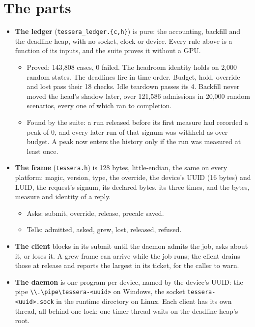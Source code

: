 \section{\texorpdfstring{The parts}{The parts}}

\begin{itemize}
\item \textbf{The ledger} (\texttt{tessera\_\allowbreak{}ledger.\allowbreak{}\{c,h\}}) is pure: the accounting, backfill and the deadline heap, with no socket, clock or device. Every rule above is a function of its inputs, and the suite proves it without a GPU.

\begin{itemize}
\item Proved: 143,808 cases, 0 failed. The headroom identity holds on 2,000 random states. The deadlines fire in time order. Budget, hold, override and lost pass their 18 checks. Idle teardown passes its 4. Backfill never moved the head's shadow later, over 121,586 admissions in 20,000 random scenarios, every one of which ran to completion.
\item Found by the suite: a run released before its first measure had recorded a peak of 0, and every later run of that signum was withheld as over budget. A peak now enters the history only if the run was measured at least once.
\end{itemize}
\item \textbf{The frame} (\texttt{tessera.\allowbreak{}h}) is 128 bytes, little-endian, the same on every platform: magic, version, type, the override, the device's UUID (16 bytes) and LUID, the request's signum, its declared bytes, its three times, and the bytes, measure and identity of a reply.

\begin{itemize}
\item Asks: submit, override, release, precalc saved.
\item Tells: admitted, asked, grew, lost, released, refused.
\end{itemize}
\item \textbf{The client} blocks in its submit until the daemon admits the job, asks about it, or loses it. A grew frame can arrive while the job runs; the client drains those at release and reports the largest in its ticket, for the caller to warn.
\item \textbf{The daemon} is one program per device, named by the device's UUID: the pipe \texttt{\textbackslash{}\textbackslash{}.\allowbreak{}\textbackslash{}pipe\textbackslash{}tessera-\allowbreak{}<uuid>} on Windows, the socket \texttt{tessera-\allowbreak{}<uuid>.\allowbreak{}sock} in the runtime directory on Linux. Each client has its own thread, all behind one lock; one timer thread waits on the deadline heap's root.


\end{itemize}
